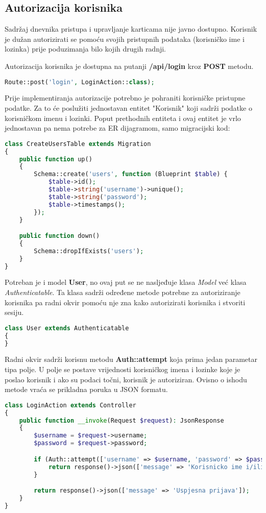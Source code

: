 \subsection{Autorizacija korisnika}

Sadržaj dnevnika pristupa i upravljanje karticama nije javno dostupno.
Korisnik je dužan autorizirati se pomoću svojih pristupnih podataka (korisničko ime i lozinka) prije poduzimanja bilo
kojih drugih radnji.

Autorizacija korisnika je dostupna na putanji \textbf{/api/login} kroz \textbf{POST} metodu.

\begin{lstlisting}[language=PHP]
Route::post('login', LoginAction::class);
\end{lstlisting}

Prije implementiranja autorizacije potrebno je pohraniti korisničke pristupne podatke.
Za to će poslužiti jednostavan entitet "Korisnik" koji sadrži podatke o korisničkom imenu i lozinki.
Poput prethodnih entiteta i ovaj entitet je vrlo jednostavan pa nema potrebe za ER dijagramom, samo migracijski kod:

\begin{lstlisting}[language=PHP]
class CreateUsersTable extends Migration
{
    public function up()
    {
        Schema::create('users', function (Blueprint $table) {
            $table->id();
            $table->string('username')->unique();
            $table->string('password');
            $table->timestamps();
        });
    }

    public function down()
    {
        Schema::dropIfExists('users');
    }
}
\end{lstlisting}

Potreban je i model \textbf{User}, no ovaj put se ne nasljeđuje klasa \textit{Model} već klasa \textit{Authenticatable}.
Ta klasa sadrži određene metode potrebne za autoriziranje korisnika pa radni okvir pomoću nje zna kako autorizirati korisnika
i stvoriti sesiju.

\begin{lstlisting}[language=PHP]
class User extends Authenticatable
{
}
\end{lstlisting}

Radni okvir sadrži korisnu metodu \textbf{Auth::attempt} koja prima jedan parametar tipa polje.
U polje se postave vrijednosti korisničkog imena i lozinke koje je poslao korisnik i ako su podaci točni, korisnik je autoriziran.
Ovisno o ishodu metode vraća se prikladna poruka u JSON formatu.

\begin{lstlisting}[language=PHP]
class LoginAction extends Controller
{
    public function __invoke(Request $request): JsonResponse
    {
        $username = $request->username;
        $password = $request->password;

        if (Auth::attempt(['username' => $username, 'password' => $password]) === false) {
            return response()->json(['message' => 'Korisnicko ime i/ili lozinka su ne ispravni.'], 401);
        }

        return response()->json(['message' => 'Uspjesna prijava']);
    }
}
\end{lstlisting}
